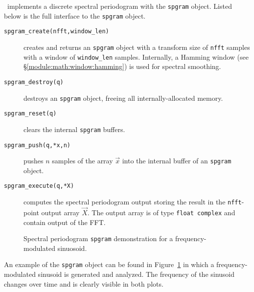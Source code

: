 \liquid\ implements a discrete spectral periodogram with the
{\tt spgram} object.
%
Listed below is the full interface to the {\tt spgram} object.
%
\begin{description}
\item[{\tt spgram\_create(nfft,window\_len)}]
    creates and returns an {\tt spgram} object with a transform size of
    {\tt nfft} samples with a window of {\tt window\_len} samples.
    Internally,
    a Hamming window (see \S\ref{module:math:window:hamming})
    is used for spectral smoothing.
\item[{\tt spgram\_destroy(q)}]
    destroys an {\tt spgram} object, freeing all internally-allocated
    memory.
\item[{\tt spgram\_reset(q)}]
    clears the internal {\tt spgram} buffers.
\item[{\tt spgram\_push(q,*x,n)}]
    pushes $n$ samples of the array $\vec{x}$ into the internal buffer
    of an {\tt spgram} object.
\item[{\tt spgram\_execute(q,*X)}]
    computes the spectral periodogram output storing the result in the
    {\tt nfft}-point output array $\vec{X}$.
    The output array is of type {\tt float complex} and contain
    output of the FFT.
\end{description}
%
\begin{figure}
\centering
{}
\caption{Spectral periodogram {\tt spgram} demonstration for a frequency-modulated sinuosoid.}
\label{fig:module:fft:spgram}
\end{figure}
%
An example of the {\tt spgram} object can be
found in Figure~\ref{fig:module:fft:spgram} in which a
frequency-modulated sinusoid is generated and analyzed.
The frequency of the sinusoid changes over time and is clearly visible
in both plots.

